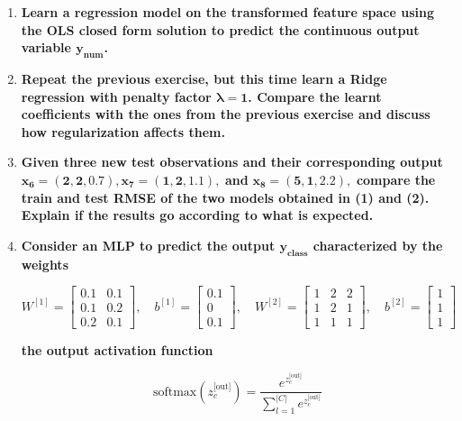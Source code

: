 \documentclass[12pt]{article}
\begin{document}
\begin{enumerate}
    \item \textbf{Learn a regression model on the transformed feature space using the OLS closed form
    solution to predict the continuous output variable $\mathbf{y_{\text{num}}}$.}
    
    \item \textbf{Repeat the previous exercise, but this time learn a Ridge regression with penalty
    factor $\mathbf{\lambda = 1}$. Compare the learnt coeﬃcients with the ones from the previous exercise and
    discuss how regularization aﬀects them.}

    \item \textbf{Given three new test observations and their corresponding output\\}
    $\mathbf{x_6 = (2,2,0.7), x_7 = (1,2,1.1),}$ \textbf{ and } $\mathbf{x_8 = (5,1,2.2),}$
    \textbf{compare the train and test RMSE of the two models obtained in (1) and (2). Explain if the results go according to what is expected.}    

    \item \textbf{Consider an MLP to predict the output $\mathbf{y_\text{class}}$ characterized by the weights}
    
    \[
W^{[1]} = \begin{bmatrix}
0.1 & 0.1 \\
0.1 & 0.2 \\
0.2 & 0.1
\end{bmatrix}, \quad
b^{[1]} = \begin{bmatrix}
0.1 \\
0 \\
0.1
\end{bmatrix}, \quad
W^{[2]} = \begin{bmatrix}
1 & 2 & 2 \\
1 & 2 & 1 \\
1 & 1 & 1
\end{bmatrix}, \quad
b^{[2]} = \begin{bmatrix}
1 \\
1 \\
1
\end{bmatrix}
\]

\textbf{the output activation function}

\begin{equation*}
    \text{softmax}(z_c^\text{[out]}) = \frac{e^{z_c^\text{[out]}}}{\sum_{l=1}^{|C|} e^{z_c^\text{[out]}}}
\end{equation*}


\end{enumerate}
\end{document}
